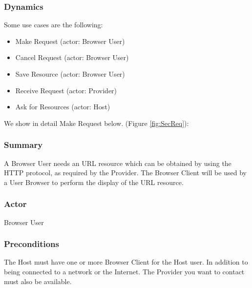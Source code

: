 \documentclass{sig-alternate-05-2015}
\begin{document}
    \subsubsection*{Dynamics}
    Some use cases are the following:
    \begin{itemize}
      \item Make Request (actor: Browser User)
      \item Cancel Request (actor: Browser User)
      \item Save Resource (actor: Browser User)
      \item Receive Request (actor: Provider)
      \item Ask for Resources (actor: Host)
    \end{itemize}
    We show in detail Make Request below. (Figure \ref{fig:SecReq}):
    \subsubsection*{Summary} A Browser User needs an URL resource which can be obtained by using the HTTP protocol, as required by the Provider. The Browser Client will be used by a User Browser to perform the display of the URL resource.
    \subsubsection*{Actor} Browser User
    \subsubsection*{Preconditions} The Host must have one or more Browser Client for the Host user. In addition to being connected to a network or the Internet. The Provider you want to contact must also be available.
\end{document}

